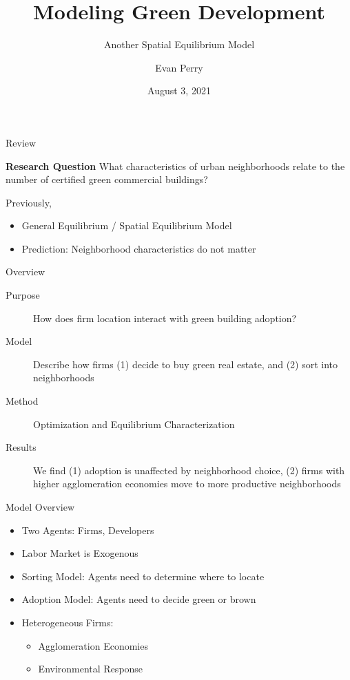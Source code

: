 \documentclass[11pt, dvipsnames, usenames]{beamer}
\title{Modeling Green Development}
\subtitle{Another Spatial Equilibrium Model}
\institute{Spellman Program}
\author{Evan Perry}
\date{August 3, 2021}
\begin{document}
\maketitlepage

\begin{frame}{Review}

\begin{exampleblock}{\large\textbf{Research Question}}
What characteristics of urban neighborhoods relate to the number of certified green commercial buildings?
\end{exampleblock}

\vfill
Previously,
\begin{itemize}
	\item General Equilibrium / Spatial Equilibrium Model
	\item Prediction: Neighborhood characteristics do not matter
\end{itemize}

\end{frame}

\begin{frame}{Overview}

\begin{description}
\item[Purpose] How does firm location interact with green building adoption? 

\vfill
\item[Model] Describe how firms  (1) decide to buy green real estate, and (2) sort into neighborhoods

\vfill
\item[Method] Optimization and Equilibrium Characterization

\vfill
\item[Results] We find (1) adoption is unaffected by neighborhood choice, (2) firms with higher agglomeration economies move to more productive neighborhoods
\end{description}

\end{frame}


\begin{frame}{Model Overview}

\begin{itemize}
\item Two Agents: Firms, Developers
\vfill
\item Labor Market is Exogenous
\vfill
\item Sorting Model: Agents need to determine where to locate
\vfill
\item Adoption Model: Agents need to decide green or brown
\vfill
\item Heterogeneous Firms:
\begin{itemize}
	\item Agglomeration Economies
	\item Environmental Response
\end{itemize}
\end{itemize}

\end{frame}
\end{document}
